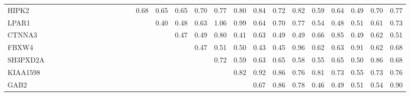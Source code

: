 \begin{longtable}{lrrrrrrrrrrrrrrrrrrrrrrrrrr}
HIPK2    &              &             &            &              &              &            &            &            &            &              &               &             &        0.68 &         0.65 &        0.65 &           0.70 &           0.77 &       0.80 &       0.84 &           0.72 &        0.82 &        0.59 &      0.64 &        0.49 &           0.70 &        0.77 \\
LPAR1    &              &             &            &              &              &            &            &            &            &              &               &             &             &         0.40 &        0.48 &           0.63 &           1.06 &       0.99 &       0.64 &           0.70 &        0.77 &        0.54 &      0.48 &        0.51 &           0.61 &        0.73 \\
CTNNA3   &              &             &            &              &              &            &            &            &            &              &               &             &             &              &        0.47 &           0.49 &           0.80 &       0.41 &       0.63 &           0.49 &        0.49 &        0.66 &      0.85 &        0.49 &           0.62 &        0.51 \\
FBXW4    &              &             &            &              &              &            &            &            &            &              &               &             &             &              &             &           0.47 &           0.51 &       0.50 &       0.43 &           0.45 &        0.96 &        0.62 &      0.63 &        0.91 &           0.62 &        0.68 \\
SH3PXD2A &              &             &            &              &              &            &            &            &            &              &               &             &             &              &             &                &           0.72 &       0.59 &       0.63 &           0.65 &        0.58 &        0.55 &      0.65 &        0.50 &           0.86 &        0.68 \\
KIAA1598 &              &             &            &              &              &            &            &            &            &              &               &             &             &              &             &                &                &       0.82 &       0.92 &           0.86 &        0.76 &        0.81 &      0.73 &        0.55 &           0.73 &        0.76 \\
GAB2     &              &             &            &              &              &            &            &            &            &              &               &             &             &              &             &                &                &            &       0.67 &           0.86 &        0.78 &        0.46 &      0.49 &        0.51 &           0.54 &        0.90 \\

\end{longtable}
